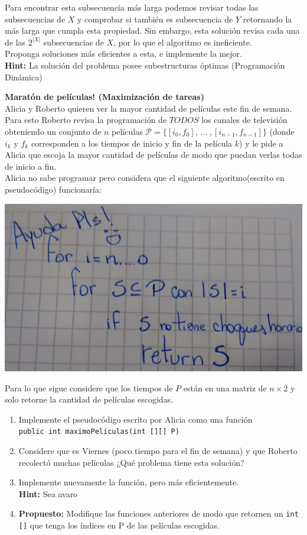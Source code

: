 \documentclass[dcc]{fcfmcourse}
\begin{document}
\begin{problems}
Para encontrar esta subsecuencia más larga podemos revisar todas las subsecuencias de $X$ y comprobar si también es subsecuencia de $Y$ retornando la más larga que cumpla esta propiedad. Sin embargo, esta solución revisa cada una de las $2^{|X|}$ subsecuencias de $X$, por lo que el algoritmo es ineficiente.\\

Proponga soluciones más eficientes a esta, e implemente la mejor.\\
\textbf{Hint:} La solución del problema posee subestructuras óptimas (Programación Dinámica)


\problem \textbf{Maratón de películas! (Maximización de tareas)}\\
Alicia y Roberto quieren ver la mayor cantidad de películas este fin de semana. Para esto Roberto revisa la programación de $TODOS$ los canales de televisión obteniendo un conjunto de $n$ películas $\mathcal{P} =\lbrace [i_{0},f_{0}],\ \ldots \ , [i_{n-1},f_{n-1}] \rbrace$ (donde $i_{k}$ y $f_{k}$ corresponden a los tiempos de inicio y fin de la película $k$) y le pide a Alicia que escoja la mayor cantidad de películas de modo que puedan verlas todas de inicio a fin.\\

Alicia no sabe programar pero considera que el siguiente algoritmo(escrito en pseudocódigo) funcionaría:
\begin{center}
\includegraphics[scale=0.18]{Algoritmo.jpg}
\end{center}
Para lo que sigue considere que los tiempos de $P$ están en una matriz de $n \times 2$ y solo retorne la cantidad de películas escogidas.
\begin{enumerate}
    \item Implemente el pseudocódigo escrito por Alicia como una función\\ \texttt{public int maximoPeliculas(int [][] P)}
    \item Considere que es Viernes (poco tiempo para el fin de semana) y que Roberto recolectó muchas películas ¿Qué problema tiene esta solución?
    \item Implemente nuevamente la función, pero más eficientemente.\\
    \textbf{Hint:} Sea avaro
    \item \textbf{Propuesto:} Modifique las funciones anteriores de modo que retornen un \texttt{int []} que tenga los índices en P de las películas escogidas.
\end{enumerate}
\end{problems}
\end{document}

